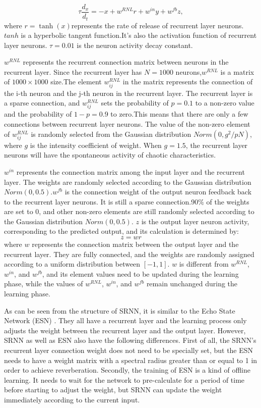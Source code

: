 \documentclass[runningheads]{llncs}
\begin{document}
\begin{equation}
\tau \frac{d_x}{d_t}=-x+w^{RNL}r+w^{in}y+w^{fb}z,
\end{equation}
where $r = \tanh(x)$represents the rate of release 
of recurrent layer neurons. $tanh$ is a hyperbolic 
tangent function.It's also the activation function of 
recurrent layer neurons. $\tau=0.01$ is the neuron activity
 decay constant.

$w^{RNL}$ represents the recurrent connection matrix between 
neurons in the recurrent layer.
Since the recurrent layer has $N=1000$ neurons,$w^{RNL}$ is a 
matrix of $1000\times1000$ size.The element $w_{ij}^{RNL}$
in the matrix represents the connection of 
the i-th neuron and the j-th neuron in the recurrent layer.
The recurrent layer is a sparse connection, and $w_{ij}^{RNL}$
sets the probability of $p=0.1$ to a non-zero value and the 
probability of $1-p=0.9$ to zero.This means that there are only a 
few connections between recurrent layer neurons.
The value of the non-zero element of $w_{ij}^{RNL}$ 
is randomly selected from the Gaussian distribution $Norm(0,g^{2}/pN)$,
where $g$ is the intensity coefficient of weight.
When $g=1.5$, the recurrent layer neurons will have the 
spontaneous activity of chaotic characteristics\cite{RN17}.

$w^{in}$ represents the connection matrix among the 
input layer and the recurrent layer.
The weights are randomly selected according to the 
Gaussian distribution $Norm(0, 0.5)$.$w^{fb}$ is the connection 
weight of the output neuron feedback back to the recurrent layer neurons. 
It is still a sparse connection.90$\%$ of the weights are set to 0, 
and other non-zero elements are still randomly selected according 
to the Gaussian distribution $Norm(0,0.5)$.
$z$ is the output layer neuron activity, corresponding to 
the predicted output, and its calculation is determined by:
\begin{equation}
z=wr
\end{equation}
where $w$ represents the connection matrix between the output layer 
and the recurrent layer. They are 
fully connected, and the weights are randomly assigned according 
to a uniform distribution between $\left[-1,1\right]$. 
$w$ is different from $w^{RNL}$, $w^{in}$, and $w^{fb}$, and
its element values need to be updated during the learning phase,
 while the values of $w^{RNL}$, $w^{in}$, and $w^{fb}$ remain unchanged during 
 the learning phase.

As can be seen from the structure of SRNN, it is similar to the Echo 
State Network (ESN) \cite{RN22}.
They all have a recurrent layer and the learning process only adjusts 
the weight between the recurrent layer and the output layer. However, 
SRNN as well as ESN also have the following differences. First of all, 
the SRNN's recurrent layer connection weight does not need to be 
specially set, but the ESN needs to have a weight matrix with a 
spectral radius greater than or equal to 1 in order to achieve reverberation.
Secondly, the training of ESN is a kind of offline learning. It needs to wait 
for the network to pre-calculate for a period of time before starting to
adjust the weight, but SRNN can update the weight immediately according 
to the current input.
\end{document}
